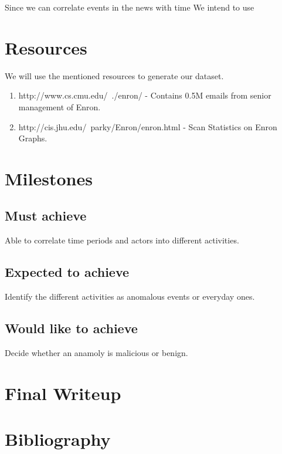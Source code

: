 \documentclass[10pt]{article}
\begin{document}
Since we can correlate events in the news with time We intend to use 


\section{Resources}
We will use the mentioned resources to generate our dataset.
\begin{enumerate}
  \item http://www.cs.cmu.edu/~./enron/ - Contains 0.5M emails from senior management of Enron. 
  \item http://cis.jhu.edu/~parky/Enron/enron.html - Scan Statistics on Enron Graphs.
\end{enumerate}
\section{Milestones}
\subsection{Must achieve}
Able to correlate time periods and actors into different activities. 
\subsection{Expected to achieve}
Identify the different activities as anomalous events or everyday ones. 
\subsection{Would like to achieve}
Decide whether an anamoly is malicious or benign.

\section{Final Writeup}

\section{Bibliography}

{\small

}
\end{document}
